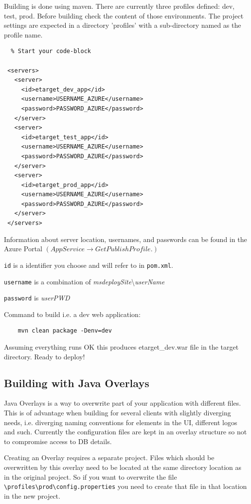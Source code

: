 \documentclass[10pt,a4paper,oneside]{article}
\begin{document}
	Building is done using maven. There are currently three profiles defined: dev, test, prod. 
	Before building check the content of those environments. The project settings are expected in a directory 
	'profiles' with a sub-directory named as the profile name.
	
	\begin{lstlisting}  % Start your code-block
	
 <servers>
   <server>
     <id>etarget_dev_app</id>
     <username>USERNAME_AZURE</username>
     <password>PASSWORD_AZURE</password>
   </server>
   <server>
     <id>etarget_test_app</id>
     <username>USERNAME_AZURE</username>
     <password>PASSWORD_AZURE</password>
   </server>
   <server>
     <id>etarget_prod_app</id>
     <username>USERNAME_AZURE</username>
     <password>PASSWORD_AZURE</password>
   </server>
 </servers>
	\end{lstlisting}
	
	Information about server location, usernames, and passwords can be found in the Azure Portal 
	$(App Service \rightarrow Get Publish Profile.)$
	
	\verb|id| is a identifier you choose and will refer to in \verb|pom.xml|. 
	
	\verb|username| is a combination of {\it msdeploySite}\textbackslash{\it userName} 
	
	\verb|password| is \textit{userPWD}
	
	Command to build i.e. a dev web application:
	\begin{lstlisting}
	mvn clean package -Denv=dev
	\end{lstlisting}

	Assuming everything runs OK this produces etarget\_dev.war file in the target directory. Ready to deploy!	
	
	\subsection{Building with Java Overlays}
	
	Java Overlays is a way to overwrite part of your application with different files. This is of advantage when building for several clients with 
	slightly diverging needs, i.e. diverging naming conventions for elements in the UI, different logos and such. Currently the configuration files 
	are kept in an overlay structure so not to compromise access to DB details.
	
	Creating an Overlay requires a separate project. Files which should be overwritten by this overlay need to be located at the same
	directory location as in the original project. So if you want to overwrite the file \verb|\profiles\prod\config.properties| you need to create
	that file in that location in the new project.
	
\end{document}
